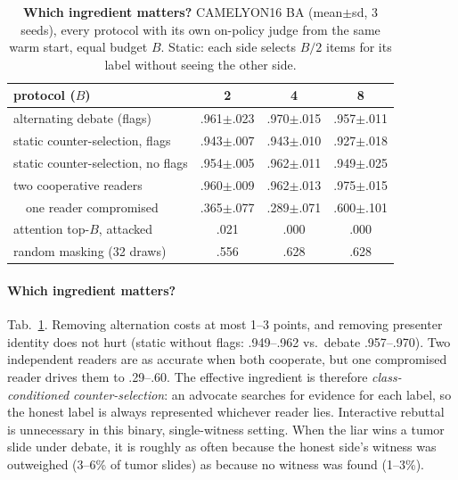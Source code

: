 \documentclass[10pt,twocolumn,letterpaper]{article}
\begin{document}
\begin{table}[t]\centering\small
\caption{\textbf{Which ingredient matters?} CAMELYON16 BA (mean$\pm$sd, 3 seeds), every protocol with its own on-policy judge from the same warm start, equal budget $B$. Static: each side selects $B/2$ items for its label without seeing the other side.}\label{tab:mech}
\setlength{\tabcolsep}{3pt}
\begin{tabular}{@{}lccc@{}}\toprule
protocol ($B$) & 2 & 4 & 8\\\midrule
alternating debate (flags) & .961{\tiny$\pm$.023} & .970{\tiny$\pm$.015} & .957{\tiny$\pm$.011}\\
static counter-selection, flags & .943{\tiny$\pm$.007} & .943{\tiny$\pm$.010} & .927{\tiny$\pm$.018}\\
static counter-selection, no flags & .954{\tiny$\pm$.005} & .962{\tiny$\pm$.011} & .949{\tiny$\pm$.025}\\\midrule
two cooperative readers & .960{\tiny$\pm$.009} & .962{\tiny$\pm$.013} & .975{\tiny$\pm$.015}\\
\ \ one reader compromised & .365{\tiny$\pm$.077} & .289{\tiny$\pm$.071} & .600{\tiny$\pm$.101}\\\midrule
attention top-$B$, attacked & .021 & .000 & .000\\
random masking (32 draws) & .556 & .628 & .628\\\bottomrule
\end{tabular}\end{table}
\paragraph{Which ingredient matters?} Tab.~\ref{tab:mech}. Removing alternation costs at most 1--3 points, and removing presenter identity does not hurt (static without flags: .949--.962 vs.\ debate .957--.970). Two independent readers are as accurate when both cooperate, but one compromised reader drives them to .29--.60. The effective ingredient is therefore \emph{class-conditioned counter-selection}: an advocate searches for evidence for each label, so the honest label is always represented whichever reader lies. Interactive rebuttal is unnecessary in this binary, single-witness setting. When the liar wins a tumor slide under debate, it is roughly as often because the honest side's witness was outweighed (3--6\% of tumor slides) as because no witness was found (1--3\%).
\end{document}
